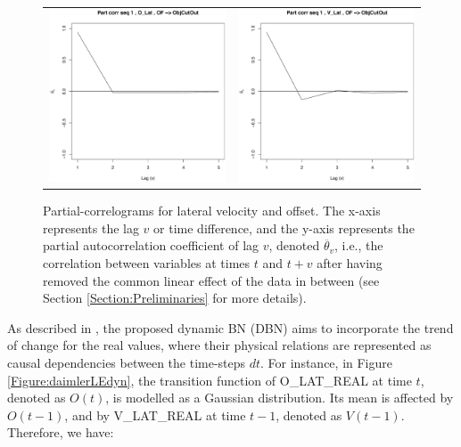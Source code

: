 \begin{figure}
  \centering
    \begin{tabular}{cc}
        \includegraphics[width=60mm]{figures/DaimlerPcorrOBJ_R5Offs.pdf}&
    \includegraphics[width=60mm]{figures/DaimlerPcorrOBJ_R5Vel.pdf}\\
  \end{tabular}
    \caption{\label{Figure:daimlerPartialCorrel}Partial-correlograms for lateral velocity and offset. The x-axis represents the lag $v$ or time difference, and the y-axis represents the partial autocorrelation coefficient of lag $v$, denoted $\ddot{\theta_v}$, i.e., the correlation between variables at times $t$ and $t+v$ after having removed the common linear effect of the data in between (see Section \ref{Section:Preliminaries} for more details).}
\end{figure}


As described in \cite{Weidl2014}, the proposed dynamic BN (DBN) aims to incorporate the trend of change for the real values, where their physical relations are represented as causal dependencies between the time-steps $dt$. For instance, in Figure \ref{Figure:daimlerLEdyn}, the transition function of O\_LAT\_REAL at time $t$, denoted as $O(t)$, is modelled as a Gaussian distribution. Its mean is affected by $O(t-1)$, and by V\_LAT\_REAL at time $t-1$, denoted as $V(t-1)$. Therefore, we have:

